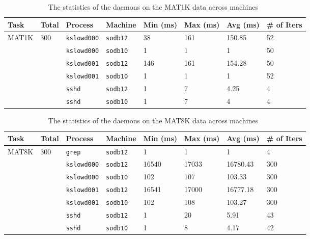 \documentclass[10pt]{article}
\begin{document}
\begin{table}[htp!]
\centering
{\small
 \begin{tabular}{|l|l|l|l|l||l|l|l|} \hline
 Task & Total & Process & Machine & Min (ms) & Max (ms) & Avg (ms) & \# of Iters\\ \hline
 MAT1K & 300 & {\tt kslowd000}  & {\tt sodb12} & 38 & 161 &  150.85 & 52 \\ \hline
 			 &  	    & {\tt kslowd000}	 & {\tt sodb10} & 1 & 1 & 1 & 50 \\ \hline 
 \hline
  &  & {\tt kslowd001}  & {\tt sodb12} & 146 & 161 & 154.28 & 50 \\ \hline
  &  & {\tt kslowd001}	& {\tt sodb10} & 1 & 1 & 1 & 52 \\ \hline 
 \hline
  &  & {\tt sshd}  & {\tt sodb12} & 1 & 7 & 4.25 & 4 \\ \hline
 &  & {\tt sshd} & {\tt sodb10} & 1 & 7  &  4 & 4 \\ \hline 
 \end{tabular}
  }
 \caption{The statistics of the daemons on the MAT1K data across machines~\label{tab:mat1K}}
\end{table}

\begin{table}[htp!]
\centering
{\small
 \begin{tabular}{|l|l|l|l|l||l|l|l|} \hline
 Task & Total & Process & Machine & Min (ms) & Max (ms) & Avg (ms) & \# of Iters\\ \hline
 MAT8K & 300 & {\tt grep} & {\tt sodb12} & 1 & 1 & 1 & 4 \\ \hline
 \hline
  &  & {\tt kslowd000}  & {\tt sodb12} & 16540 & 17033 & 16780.43 & 300 \\ \hline
 &  & {\tt kslowd000}	& {\tt sodb10} & 102 & 107 & 103.33 & 300 \\ \hline 
 \hline
  &  & {\tt kslowd001}  & {\tt sodb12} & 16541 & 17000 & 16777.18 & 300 \\ \hline
  &  & {\tt kslowd001}	& {\tt sodb10} & 102 & 108 & 103.27 & 300 \\ \hline 
 \hline
  &  & {\tt sshd}  & {\tt sodb12} & 1 & 20 & 5.91 & 43 \\ \hline
 &  & {\tt sshd} & {\tt sodb10} & 1 & 8  &  4.17 & 42 \\ \hline 
 \end{tabular}
  }
 \caption{The statistics of the daemons on the MAT8K data across machines~\label{tab:mat8K}}
\end{table}
\end{document}
